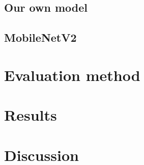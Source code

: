 \documentclass{article}
\begin{document}
	\subsection{Our own model}
	
	
	
	\subsection{MobileNetV2}
	
	
	
	\section{Evaluation method}
	
	\section{Results}
	
	\section{Discussion}
	
\end{document}
